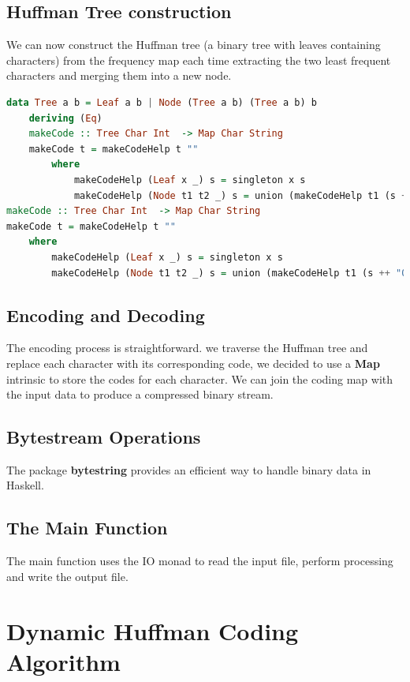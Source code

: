 \documentclass{article}
\begin{document}
\subsection{Huffman Tree construction}

We can now construct the Huffman tree (a binary tree with leaves containing characters) from the frequency map
each time extracting the two least frequent characters and merging them into a new node.

\begin{lstlisting}[language=Haskell, caption={Huffman tree construction.}]
data Tree a b = Leaf a b | Node (Tree a b) (Tree a b) b
    deriving (Eq)
    makeCode :: Tree Char Int  -> Map Char String
    makeCode t = makeCodeHelp t ""
        where
            makeCodeHelp (Leaf x _) s = singleton x s
            makeCodeHelp (Node t1 t2 _) s = union (makeCodeHelp t1 (s ++ "0")) (makeCodeHelp t2 (s ++ "1"))
makeCode :: Tree Char Int  -> Map Char String
makeCode t = makeCodeHelp t ""
    where
        makeCodeHelp (Leaf x _) s = singleton x s
        makeCodeHelp (Node t1 t2 _) s = union (makeCodeHelp t1 (s ++ "0")) (makeCodeHelp t2 (s ++ "1"))
\end{lstlisting}

\subsection{Encoding and Decoding}

The encoding process is straightforward. we traverse the Huffman tree and replace each character with its corresponding code,
we decided to use a \textbf{Map} intrinsic to store the codes for each character. 
We can join the coding map with the input data to produce a compressed binary stream.

\subsection{Bytestream Operations}

The package \textbf{bytestring} provides an efficient way to handle binary data in Haskell.

\subsection{The Main Function}

The main function uses the IO monad to read the input file, perform processing and write the output file.

\section{Dynamic Huffman Coding Algorithm}
\end{document}
